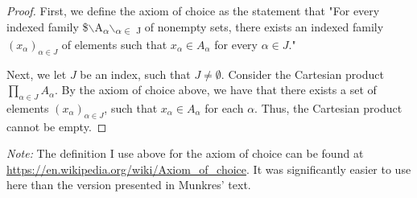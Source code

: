 \documentclass[11pt]{article}
\begin{document}
\begin{proof}
First, we define the axiom of choice as the statement that "For every indexed
family \$$\backslash${A\textsubscript{\(\alpha\)}$\backslash$}\textsubscript{\(\alpha \in\) J} of nonempty sets, there exists an indexed
family \((x_{\alpha})_{\alpha \in J}\) of elements such that \(x_{\alpha}\in
A_{\alpha}\) for every \(\alpha \in J\)." 

Next, we let \(J\) be an index, such that \(J \not = \emptyset\). Consider the
Cartesian product \(\prod\limits_{\alpha\in J} A_{\alpha}\). By the axiom of
choice above, we have that there exists a set of elements
\((x_{\alpha})_{\alpha\in J}\), such that \(x_{\alpha}\in A_{\alpha}\) for each
\(\alpha\). Thus, the Cartesian product cannot be empty. 
\end{proof}

\textit{Note:} The definition I use above for the axiom of choice can be found
at \url{https://en.wikipedia.org/wiki/Axiom\_of\_choice}. It was significantly easier to
use here than the version presented in Munkres' text. 
\end{document}
